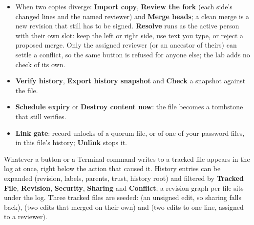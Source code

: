\begin{itemize}
{  file or a change} the holder sees the message and presses \textbf{Accept
  request} or \textbf{Decline request} ( or
  , with  naming their own copy so the request
  is recorded there). The asker's copy records the answer by itself
  () when the asker is next signed in with their USB
  inserted. A request only asks: nothing is delivered or
  changed. To serve an accepted file request the holder uses \textbf{Share
  file}; a change arrives as an ordinary revision. The log shows the request
  id, kind and decision, never the message.
  \item When two copies diverge: \textbf{Import copy}, \textbf{Review the
  fork} (each side's changed lines and the named reviewer) and
  \textbf{Merge heads}; a clean merge is a new revision that still has to be
  signed. \textbf{Resolve} runs  as the active
  person with their own slot: keep the left or right side, use text you
  type, or reject a proposed merge. Only the assigned reviewer (or an
  ancestor of theirs) can settle a conflict, so the same button is refused
  for anyone else; the lab adds no check of its own.
  \item \textbf{Verify history}, \textbf{Export history snapshot} and
  \textbf{Check} a snapshot against the file.
  \item \textbf{Schedule expiry} or \textbf{Destroy content now}: the file
  becomes a tombstone that still verifies.
  \item \textbf{Link gate}: record unlocks of a quorum file, or of one of
  your password files, in this file's history; \textbf{Unlink} stops it.
\end{itemize}

Whatever a button or a Terminal command writes to a tracked file appears in
the log at once, right below the action that caused it. History entries can
be expanded (revision, labels, parents, trust, history root) and filtered
by \textbf{Tracked File}, \textbf{Revision}, \textbf{Security},
\textbf{Sharing} and \textbf{Conflict}; a revision graph per file sits
under the log. Three tracked files are seeded:  (an
unsigned edit, so sharing falls back),  (two edits that
merged on their own) and  (two edits to one line, assigned
to a reviewer).


